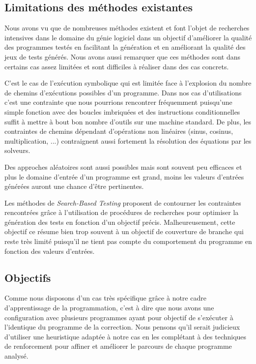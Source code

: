 \subsection{Limitations des méthodes existantes}
Nous avons vu que de nombreuses méthodes existent et font l'objet de recherches intensives dans le domaine du génie logiciel dans un objectif d'améliorer la qualité des programmes testés en facilitant la génération et en améliorant la qualité des jeux de tests générés. Nous avons aussi remarquer que ces méthodes sont dans certains cas assez limitées et sont difficiles à réaliser dans des cas concrets.

C'est le cas de l'exécution symbolique qui est limitée face à l'explosion du nombre de chemins d'exécutions possibles d'un programme. Dans nos cas d'utilisations c'est une contrainte que nous pourrions rencontrer fréquemment puisqu'une simple fonction avec des boucles imbriquées et des instructions conditionnelles suffit à mettre à bout bon nombre d'outils sur une machine standard. De plus, les contraintes de chemins dépendant d'opérations non linéaires (sinus, cosinus, multiplication, ...) contraignent aussi fortement la résolution des équations par les solveurs.

Des approches aléatoires sont aussi possibles mais sont souvent peu efficaces et plus le domaine d'entrée d'un programme est grand, moins les valeurs d'entrées générées auront une chance d'être pertinentes.

Les méthodes de \textit{Search-Based Testing} proposent de contourner les contraintes rencontrées grâce à l'utilisation de procédures de recherches pour optimiser la génération des tests en fonction d'un objectif précis. Malheureusement, cette objectif ce résume bien trop souvent à un objectif de couverture de branche qui reste très limité puisqu'il ne tient pas compte du comportement du programme en fonction des valeurs d'entrées.

\subsection{Objectifs}
Comme nous disposons d'un cas très spécifique grâce à notre cadre d'apprentissage de la programmation, c'est à dire que nous avons une configuration avec plusieurs programmes ayant pour objectif de s'exécuter à l'identique du programme de la correction. Nous pensons qu'il serait judicieux d'utiliser une heuristique adaptée à notre cas en les complétant à des techniques de renforcement pour affiner et améliorer le parcours de chaque programme analysé.

